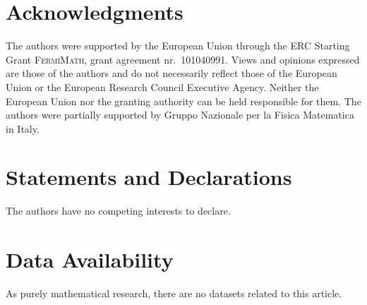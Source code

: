 \documentclass[12pt,a4paper]{article}
\numberwithin{equation}{section}
\newcommand{\1}{\mathbb{I}}
\theoremstyle{plain}
\theoremstyle{definition}
\theoremstyle{remark}
\theoremstyle{plain}
\theoremstyle{definition}
\theoremstyle{remark}
\begin{document}
\section*{Acknowledgments}
The authors were supported by the European Union through the ERC Starting Grant \textsc{FermiMath}, grant agreement nr.~101040991. Views and opinions expressed are those of the authors and do not necessarily reflect those of the European Union or the European Research Council Executive Agency. Neither the European Union nor the granting authority can be held responsible for them. The authors were partially supported by Gruppo Nazionale per la Fisica Matematica in Italy.

\section*{Statements and Declarations}
The authors have no competing interests to declare.

\section*{Data Availability}
As purely mathematical research, there are no datasets related to this article.
\end{document}
